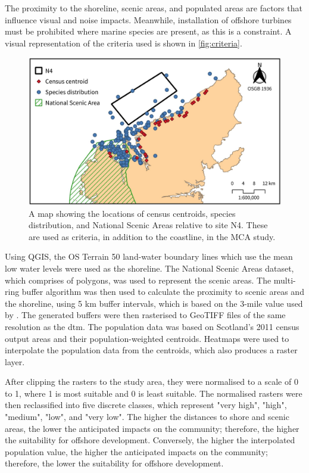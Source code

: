 The proximity to the shoreline, scenic areas, and populated areas are factors that influence visual and noise impacts. Meanwhile, installation of offshore turbines must be prohibited where marine species are present, as this is a constraint. A visual representation of the criteria used is shown in \autoref{fig:criteria}.

\begin{figure}
  \centering
  \includegraphics{images/maps/criteria}
  \caption{A map showing the locations of census centroids, species distribution, and National Scenic Areas relative to site N4. These are used as criteria, in addition to the coastline, in the MCA study. \label{fig:criteria}}
\end{figure}

Using QGIS, the OS Terrain 50 land-water boundary lines which use the mean low water levels were used as the shoreline. The National Scenic Areas dataset, which comprises of polygons, was used to represent the scenic areas. The multi-ring buffer algorithm was then used to calculate the proximity to scenic areas and the shoreline, using 5 km buffer intervals, which is based on the 3-mile value used by \textcite{mekonnen2015}. The generated buffers were then rasterised to GeoTIFF files of the same resolution as the \gls{dtm}. The population data was based on Scotland's 2011 census output areas and their population-weighted centroids. Heatmaps were used to interpolate the population data from the centroids, which also produces a raster layer.

After clipping the rasters to the study area, they were normalised to a scale of 0 to 1, where 1 is most suitable and 0 is least suitable. The normalised rasters were then reclassified into five discrete classes, which represent "very high", "high", "medium", "low", and "very low". The higher the distances to shore and scenic areas, the lower the anticipated impacts on the community; therefore, the higher the suitability for offshore development. Conversely, the higher the interpolated population value, the higher the anticipated impacts on the community; therefore, the lower the suitability for offshore development.

